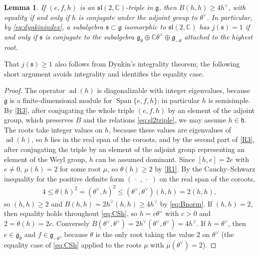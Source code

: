 \documentclass[leqno,10pt]{amsart}
\newtheorem{lemma}[theorem]{Lemma}%
\theoremstyle{definition}
\numberwithin{equation}{section}
\newcommand{\h}{\mathfrak{h}}
\newcommand{\dum}{\,\cdot\,\,}
\newcommand{\spn}{\operatorname{Span}}
\newcommand{\sll}{\mathfrak{sl}}
\newcommand{\g}{\mathfrak{g}}
\newcommand{\ad}{\operatorname{ad}}
\newcommand{\com}{\mathbb C}
\newcommand{\hv}{h^\vee}
\newcommand{\subs}{\mathfrak{s}}
\begin{document}
\begin{lemma}\label{lem:Bh}
If $(e,f,h)$ is an $\sll(2,\com)$-triple in $\g$, then $B(h,h)\ge4\hv$, with equality if and only if $h$ is conjugate under the adjoint group to $\theta^\vee$. In particular, by \eqref{eq:dynkinindex}, a subalgebra $\subs \subset \g$ isomorphic to $\sll(2, \com)$ has $j(\subs) = 1$ if and only if $\subs$ is conjugate to the subalgebra $\g_{\theta} \oplus \com\theta^{\vee} \oplus \g_{-\theta}$ attached to the highest root.
\end{lemma}
That $j(\subs) \geq 1$ also follows from Dynkin's integrality theorem; the following short argument avoids integrality and identifies the equality case.
\begin{proof}
The operator $\ad(h)$ is diagonalizable with integer eigenvalues, because $\g$ is a finite-dimensional module for $\spn\{e, f, h\}$; in particular $h$ is semisimple. By \ref{R3}, after conjugating the whole triple $(e, f, h)$ by an element of the adjoint group, which preserves $B$ and the relations \eqref{eq:sl2triple}, we may assume $h \in \h$. The roots take integer values on $h$, because these values are eigenvalues of $\ad(h)$, so $h$ lies in the real span of the coroots, and by the second part of \ref{R3}, after conjugating the triple by an element of the adjoint group representing an element of the Weyl group, $h$ can be assumed dominant. Since $[h,e]=2e$ with $e\ne0$, $\mu(h)=2$ for some root $\mu$, so $\theta(h)\ge2$ by \ref{R1}. By the Cauchy--Schwarz inequality for the positive definite form $(\dum, \dum)$ on the real span of the coroots,
\begin{align}\label{eq:CSh}
4 \leq \theta(h)^2=(\theta^\vee,h)^2\le(\theta^{\vee},\theta^{\vee})(h,h)=2(h,h),
\end{align}
so $(h,h)\ge2$ and $B(h,h)=2\hv(h,h)\ge4\hv$ by \eqref{eq:Bnorm}. If $(h, h) = 2$, then equality holds throughout \eqref{eq:CSh}, so $h = c\theta^{\vee}$ with $c > 0$ and $2 = \theta(h) = 2c$. Conversely $B(\theta^\vee,\theta^\vee)=2\hv(\theta^{\vee},\theta^{\vee}) = 4\hv$. If $h = \theta^{\vee}$, then $e \in \g_{\theta}$ and $f \in \g_{-\theta}$, because $\theta$ is the only root taking the value $2$ on $\theta^{\vee}$ (the equality case of \eqref{eq:CSh} applied to the roots $\mu$ with $\mu(\theta^{\vee}) = 2$).
\end{proof}
\end{document}
